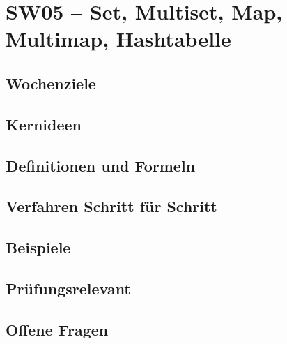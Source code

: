 \chapter{SW05 – Set, Multiset, Map, Multimap, Hashtabelle}
\label{kap:sw05}

\section*{Wochenziele}
\begin{wochenziele}
\end{wochenziele}

\section{Kernideen}

\section{Definitionen und Formeln}

\section{Verfahren Schritt für Schritt}

\section{Beispiele}

\section{Prüfungsrelevant}

\section{Offene Fragen}
